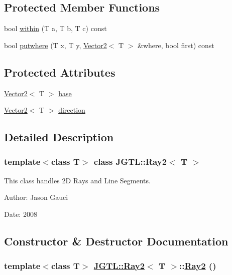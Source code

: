 \subsection*{Protected Member Functions}
\begin{CompactItemize}
\item 
bool \hyperlink{class_j_g_t_l_1_1_ray2_c41c241bb8ef64b63d43a9c5aaef78d9}{within} (T a, T b, T c) const
\item 
bool \hyperlink{class_j_g_t_l_1_1_ray2_206fd5a155f3d460b878ea94f8df3eb2}{putwhere} (T x, T y, \hyperlink{class_j_g_t_l_1_1_vector2}{Vector2}$<$ T $>$ \&where, bool first) const 
\end{CompactItemize}
\subsection*{Protected Attributes}
\begin{CompactItemize}
\item 
\hyperlink{class_j_g_t_l_1_1_vector2}{Vector2}$<$ T $>$ \hyperlink{class_j_g_t_l_1_1_ray2_5a70c3e1b6e6e940feaf0a45ab377f34}{base}
\item 
\hyperlink{class_j_g_t_l_1_1_vector2}{Vector2}$<$ T $>$ \hyperlink{class_j_g_t_l_1_1_ray2_cb20b77d19a22288144189f326a4fa79}{direction}
\end{CompactItemize}


\subsection{Detailed Description}
\subsubsection*{template$<$class T$>$ class JGTL::Ray2$<$ T $>$}

This class handles 2D Rays and Line Segments. 

\begin{Desc}
\item[Author:]Jason Gauci \end{Desc}
\begin{Desc}
\item[Date:]2008 \end{Desc}




\subsection{Constructor \& Destructor Documentation}
\hypertarget{class_j_g_t_l_1_1_ray2_31284d7badc1d41327dbe9f968c66186}{
\subsubsection[Ray2]{\setlength{\rightskip}{0pt plus 5cm}template$<$class T$>$ \hyperlink{class_j_g_t_l_1_1_ray2}{JGTL::Ray2}$<$ T $>$::\hyperlink{class_j_g_t_l_1_1_ray2}{Ray2} ()}}
\label{class_j_g_t_l_1_1_ray2_31284d7badc1d41327dbe9f968c66186}


